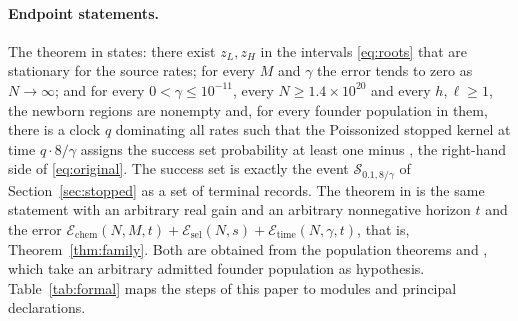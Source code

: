 \documentclass[11pt,a4paper]{article}
\theoremstyle{plain}
\theoremstyle{definition}
\theoremstyle{remark}
\newcommand{\cS}{\mathcal S}
\newcommand{\chem}{\mathcal E_{\mathrm{chem}}}
\newcommand{\Esel}{\mathcal E_{\mathrm{sel}}}
\newcommand{\Etime}{\mathcal E_{\mathrm{time}}}
\begin{document}
\paragraph{Endpoint statements.}
The theorem  in  states: there exist $z_L,z_H$ in the intervals \eqref{eq:roots} that are stationary for the source rates; for every $M$ and $\gamma$ the error  tends to zero as $N\to\infty$; and for every $0<\gamma\leq10^{-11}$, every $N\geq1.4\times10^{20}$ and every $h,\ell\geq1$, the newborn regions are nonempty and, for every founder population in them, there is a clock $q$ dominating all rates such that the Poissonized stopped kernel at time $q\cdot8/\gamma$ assigns the success set  probability at least one minus , the right-hand side of \eqref{eq:original}. The success set is exactly the event $\cS_{0.1,8/\gamma}$ of Section~\ref{sec:stopped} as a set of terminal records. The theorem  in  is the same statement with an arbitrary real gain and an arbitrary nonnegative horizon $t$ and the error $\chem(N,M,t)+\Esel(N,s)+\Etime(N,\gamma,t)$, that is, Theorem~\ref{thm:family}. Both are obtained from the population theorems  and , which take an arbitrary admitted founder population as hypothesis. Table~\ref{tab:formal} maps the steps of this paper to modules and principal declarations.
\end{document}
